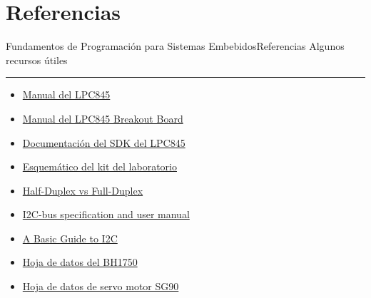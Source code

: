 \documentclass[aspectratio=169, xcolor=dvipsnames]{beamer}
\begin{document}
\section{Referencias}
\begin{frame}{Fundamentos de Programación para Sistemas Embebidos}{Referencias}
    Algunos recursos útiles
    \noindent\rule{\textwidth}{0.75pt}
    \begin{multicols}{2}
    \begin{itemize}
        \item \href{https://github.com/utn-fra-lse/lpc845/blob/main/docs/UM11029.pdf}{Manual del LPC845}
        \item \href{https://github.com/utn-fra-lse/lpc845/blob/main/docs/UM11181.pdf}{Manual del LPC845 Breakout Board}
        \item \href{https://mcuxpresso.nxp.com/api_doc/dev/116/modules.html}{Documentación del SDK del LPC845}
        \item \href{https://github.com/utn-fra-lse/lpc845/blob/main/docs/BASE_KIT_V0.pdf}{Esquemático del kit del laboratorio}
        \item \href{https://www.cbtnuggets.com/blog/communication/half-duplex-vs-full-duplex}{Half-Duplex vs Full-Duplex}
        \item \href{https://www.nxp.com/docs/en/user-guide/UM10204.pdf}{I2C-bus specification and user manual}
        \item \href{https://www.ti.com/lit/an/sbaa565/sbaa565.pdf?ts=1722944333411}{A Basic Guide to I2C}
        \item \href{https://www.mouser.com/datasheet/2/348/bh1750fvi-e-186247.pdf?srsltid=AfmBOorrR8jrAGXGPYKRRWE16YcldiiGN0-D3jy5KHvUM9A1WPh_ohTP}{Hoja de datos del BH1750}
        \item \href{http://www.ee.ic.ac.uk/pcheung/teaching/DE1_EE/stores/sg90_datasheet.pdf}{Hoja de datos de servo motor SG90}
    \end{itemize}
    \end{multicols}
\end{frame}
\end{document}
